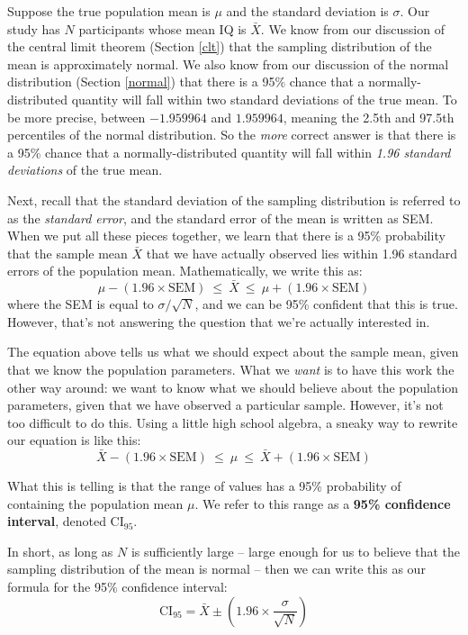 \documentclass[
]{book}
\theoremstyle{definition}
\theoremstyle{definition}
\theoremstyle{definition}
\theoremstyle{definition}
\theoremstyle{remark}
\begin{document}
Suppose the true population mean is \(\mu\) and the standard deviation is \(\sigma\). Our study has \(N\) participants whose mean IQ is \(\bar{X}\). We know from our discussion of the central limit theorem (Section \ref{clt}) that the sampling distribution of the mean is approximately normal. We also know from our discussion of the normal distribution (Section \ref{normal}) that there is a 95\% chance that a normally-distributed quantity will fall within two standard deviations of the true mean. To be more precise, between \(-1.959964\) and \(1.959964\), meaning the 2.5th and 97.5th percentiles of the normal distribution. So the \emph{more} correct answer is that there is a 95\% chance that a normally-distributed quantity will fall within \emph{1.96 standard deviations} of the true mean.

Next, recall that the standard deviation of the sampling distribution is referred to as the \emph{standard error}, and the standard error of the mean is written as SEM. When we put all these pieces together, we learn that there is a 95\% probability that the sample mean \(\bar{X}\) that we have actually observed lies within 1.96 standard errors of the population mean. Mathematically, we write this as:
\[
\mu - \left( 1.96 \times \mbox{SEM} \right) \ \leq \ \bar{X}\ \leq \ \mu + \left( 1.96 \times \mbox{SEM} \right) 
\]
where the SEM is equal to \(\sigma / \sqrt{N}\), and we can be 95\% confident that this is true. However, that's not answering the question that we're actually interested in.

The equation above tells us what we should expect about the sample mean, given that we know the population parameters. What we \emph{want} is to have this work the other way around: we want to know what we should believe about the population parameters, given that we have observed a particular sample. However, it's not too difficult to do this. Using a little high school algebra, a sneaky way to rewrite our equation is like this:
\[
\bar{X} - \left( 1.96 \times \mbox{SEM} \right) \ \leq \ \mu \ \leq \ \bar{X} + \left( 1.96 \times \mbox{SEM}\right)
\]

What this is telling is that the range of values has a 95\% probability of containing the population mean \(\mu\). We refer to this range as a \textbf{95\% confidence interval}, denoted \(\mbox{CI}_{95}\).

In short, as long as \(N\) is sufficiently large -- large enough for us to believe that the sampling distribution of the mean is normal -- then we can write this as our formula for the 95\% confidence interval:
\[
\mbox{CI}_{95} = \bar{X} \pm \left( 1.96 \times \frac{\sigma}{\sqrt{N}} \right)
\]
\end{document}

